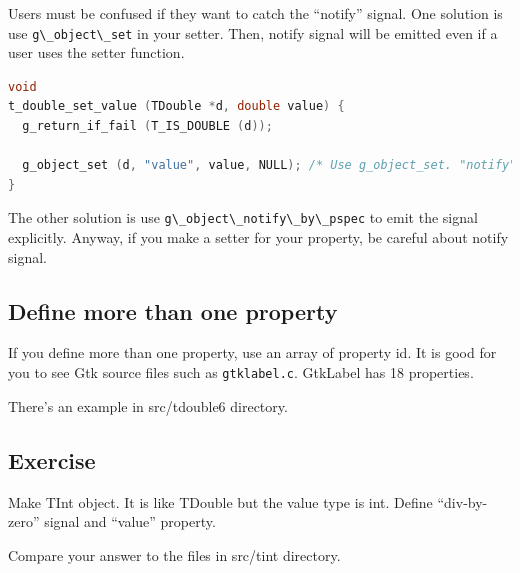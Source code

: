 Users must be confused if they want to catch the ``notify'' signal. One
solution is use \passthrough{\lstinline!g\_object\_set!} in your setter.
Then, notify signal will be emitted even if a user uses the setter
function.

\begin{lstlisting}[language=C]
void
t_double_set_value (TDouble *d, double value) {
  g_return_if_fail (T_IS_DOUBLE (d));

  g_object_set (d, "value", value, NULL); /* Use g_object_set. "notify" signal will be emitted. */
}
\end{lstlisting}

The other solution is use
\passthrough{\lstinline!g\_object\_notify\_by\_pspec!} to emit the
signal explicitly. Anyway, if you make a setter for your property, be
careful about notify signal.

\subsection{Define more than one
property}\label{define-more-than-one-property}

If you define more than one property, use an array of property id. It is
good for you to see Gtk source files such as
\passthrough{\lstinline!gtklabel.c!}. GtkLabel has 18 properties.

There's an example in src/tdouble6 directory.

\subsection{Exercise}\label{exercise}

Make TInt object. It is like TDouble but the value type is int. Define
``div-by-zero'' signal and ``value'' property.

Compare your answer to the files in src/tint directory.
